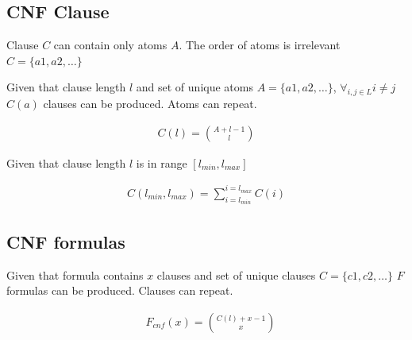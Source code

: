 %
%

\subsection{CNF Clause}

Clause $C$ can contain only atoms $A$. The order of atoms is irrelevant $C = \{a1, a2, \dots\}$

Given that 
clause length $l$ and 
set of unique atoms $A = \{a1, a2, \dots\}$, $\forall_{i,j \in L} i \neq j$
$C(a)$ clauses can be produced. Atoms can repeat.

\begin{align}
  C(l) = \binom{A + l - 1}{l}
\end{align}

Given that clause length $l$ is in range $[l_{min}, l_{max}]$

\begin{align}
  C(l_{min}, l_{max}) = \sum_{i=l_{min}}^{i=l_{max}} C(i) \label{eq:clause}
\end{align}

\subsection{CNF formulas}

Given that
formula contains $x$ clauses and
set of unique clauses $C = \{c1,c2, \dots\}$
$F$ formulas can be produced. Clauses can repeat.

\begin{align}
  &F_{cnf}(x) = \binom{C(l) + x - 1}{x} \label{eq:cnfformula}
\end{align}
